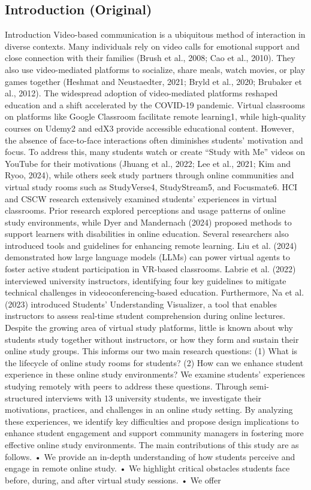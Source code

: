\documentclass[12pt]{ctexart}
\begin{document}
\subsection*{Introduction (Original)}

Introduction Video-based communication is a ubiquitous method of interaction in diverse contexts. Many individuals rely on video calls for emotional support and close connection with their families (Brush et al., 2008; Cao et al., 2010). They also use video-mediated platforms to socialize, share meals, watch movies, or play games together (Heshmat and Neustaedter, 2021; Bryld et al., 2020; Brubaker et al., 2012). The widespread adoption of video-mediated platforms reshaped education and a shift accelerated by the COVID-19 pandemic. Virtual classrooms on platforms like Google Classroom facilitate remote learning1, while high-quality courses on Udemy2 and edX3 provide accessible educational content. However, the absence of face-to-face interactions often diminishes students’ motivation and focus. To address this, many students watch or create “Study with Me” videos on YouTube for their motivations (Jhuang et al., 2022; Lee et al., 2021; Kim and Ryoo, 2024), while others seek study partners through online communities and virtual study rooms such as StudyVerse4, StudyStream5, and Focusmate6. HCI and CSCW research extensively examined students’ experiences in virtual classrooms. Prior research explored perceptions and usage patterns of online study environments, while Dyer and Mandernach (2024) proposed methods to support learners with disabilities in online education. Several researchers also introduced tools and guidelines for enhancing remote learning. Liu et al. (2024) demonstrated how large language models (LLMs) can power virtual agents to foster active student participation in VR-based classrooms. Labrie et al. (2022) interviewed university instructors, identifying four key guidelines to mitigate technical challenges in videoconferencing-based education. Furthermore, Na et al. (2023) introduced Students’ Understanding Visualizer, a tool that enables instructors to assess real-time student comprehension during online lectures. Despite the growing area of virtual study platforms, little is known about why students study together without instructors, or how they form and sustain their online study groups. This informs our two main research questions: (1) What is the lifecycle of online study rooms for students? (2) How can we enhance student experience in these online study environments? We examine students’ experiences studying remotely with peers to address these questions. Through semi-structured interviews with 13 university students, we investigate their motivations, practices, and challenges in an online study setting. By analyzing these experiences, we identify key difficulties and propose design implications to enhance student engagement and support community managers in fostering more effective online study environments. The main contributions of this study are as follows. • We provide an in-depth understanding of how students perceive and engage in remote online study. • We highlight critical obstacles students face before, during, and after virtual study sessions. • We offer 
\end{document}
